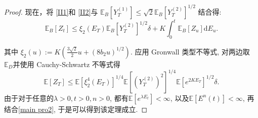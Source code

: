 \begin{proof}
	现在，将 \cref{II1}和 \cref{II2}与  $\mathbb{E}_B[Y_T^{(1)}]\leq\sqrt{2}\mathbb{E}_B[Y_T^{(2)}]^{1/2}$ 结合得:
	\begin{equation*}
		\mathbb{E}_B[Z_t] 
		\leq \xi_2(E_T)\mathbb{E}_B[Y_T^{(2)}]^{1/2}\delta + K\int_0^t\mathbb{E}_B[Z_u] \mathrm{d}E_u.
	\end{equation*}
	
	其中 $\xi_2(u) := K(\frac{3\sqrt{2}}{2}u + (8b_2u)^{1/2}).$
	应用 Gronwall 类型不等式, 对两边取 $ \mathbb{E}_D $并使用 Cauchy-Schwartz 不等式得 
	\begin{equation*}
		\mathbb{E}[Z_T] \leq \mathbb{E}[\xi_2^4(E_T)]^{1/4}\mathbb{E}[(Y_T^{(2)})^2]^{1/4}\mathbb{E}[e^{2KE_T}]^{1/2}\delta.
	\end{equation*}
	由于对于任意的$\lambda>0, t>0,n>0$, 都有$\mathbb{E}[e^{\lambda E_t}] < \infty$, 以及$\mathbb{E}[E^n(t)] < \infty$, 再结合\cref{main pro2}, 于是可以得到该定理成立.
\end{proof}






